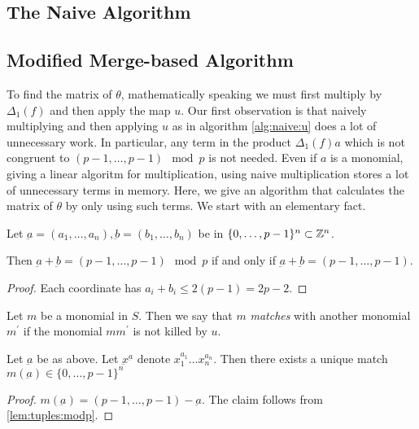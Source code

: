 
\subsection{The Naive Algorithm}

\subsection{Modified Merge-based Algorithm}

To find the matrix of \(\theta\), mathematically
speaking we must first multiply by \(\Delta_{1}(f)\) 
and then apply the map \(u\).
Our first observation is that naively 
multiplying and then applying \(u\) 
as in algorithm \ref{alg:naive:u}
does a lot of unnecessary work.
In particular, any term in the 
product \(\Delta_{1}(f)a\) which 
is not congruent to 
\((p-1, \ldots, p-1) \mod p\)
is not needed. 
Even if \(a\) is a monomial, giving a linear
algoritm for multiplication, using naive
multiplication stores a lot of unnecessary terms
in memory.
Here, we give an algorithm that calculates
the matrix of \(\theta\) by only
using such terms.
We start with an elementary fact.

\begin{lem}
	\label{lem:tuples:modp}
	Let \(\underbar{a} = (a_{1}, \ldots, a_{n}),
	\underbar{b} = (b_{1}, \ldots, b_{n})\)
	be in \(\{0, \ldots, p-1\}^{n} \subset \mathbb{Z}^{n}\).

	Then \(\underbar{a} + \underbar{b} = 
	(p-1, \ldots, p-1) \mod p\)
	if and only if 
	\(\underbar{a} + \underbar{b} = 
	(p-1, \ldots, p-1)\).
\end{lem}

\begin{proof}
	Each coordinate has \(a_{i} + b_{i} \leq 2(p-1) = 2p-2\).
\end{proof}

\begin{defn}
	Let \(m\) be a monomial in \(S\). 
	Then we say that \(m\) \textit{matches}
	with another monomial \(m^{\prime}\) 
	if the monomial \(mm^{\prime}\) is
	not killed by \(u\).
\end{defn}

\begin{cor}
	Let \(\underbar{a}\) be as above.
	Let \(\underbar{x}^{\underbar{a}}\)
	denote \(x_{1}^{a_{1}} \ldots x_{n}^{a_{n}}\).
	Then there exists a unique
	match \(m(\underbar{a}) \in \{0, \ldots, p-1\}^{n}\) 
\end{cor}

\begin{proof}
	\(m(\underbar{a}) = 
	(p-1, \ldots, p-1) - \underbar{a}\).
	The claim follows from 
	\ref{lem:tuples:modp}.
\end{proof}

